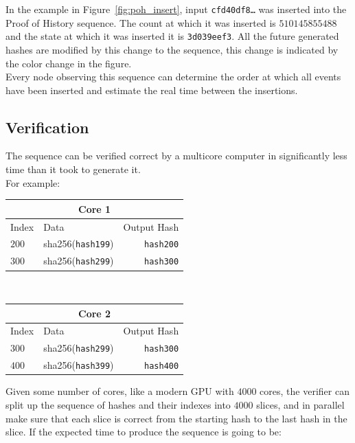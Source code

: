 \documentclass[12pt]{article}
\begin{document}
  In the example in Figure~\ref{fig:poh_insert}, input \texttt{cfd40df8\ldots} was inserted into the Proof of History sequence. The count at which it was inserted is $510145855488$ and the state at which it was inserted it is \texttt{3d039eef3}. All the future generated hashes are modified by this change to the sequence, this change is indicated by the color change in the figure.\\

Every node observing this sequence can determine the order at which all events have been inserted and estimate the real time between the insertions.

\subsection{Verification}\label{poh:verify}
The sequence can be verified correct by a multicore computer in significantly less time than it took to generate it.\\

\noindent For example: \\\noindent

\begin{center}

\begin{tabular}{l l r}
    \multicolumn{3}{c}{Core 1} \\ \hline
    Index & Data & Output Hash \\ \hline
    $200$ & sha256(\texttt{hash199}) & \texttt{hash200} \\ 
    $300$ & sha256(\texttt{hash299}) & \texttt{hash300}\\ 
    \end{tabular}\\
    
  \begin{tabular}{l l r}
    \multicolumn{3}{c}{Core 2} \\
    \hline
    Index & Data & Output Hash \\ \hline
    $300$ & sha256(\texttt{hash299}) & \texttt{hash300} \\
    $400$ & sha256(\texttt{hash399}) & \texttt{hash400}\\ 
    \end{tabular}
    
\end{center}


Given some number of cores, like a modern GPU with $4000$ cores, the verifier can split up the sequence of hashes and their indexes into $4000$ slices, and in parallel make sure that each slice is correct from the starting hash to the last hash in the slice. If the expected time to produce the sequence is going to be:\\
\end{document}
